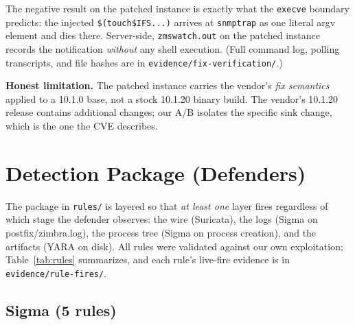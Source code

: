 The negative result on the patched instance is exactly what the
\texttt{execve} boundary predicts: the injected
\texttt{\$(touch\${IFS}...)} arrives at \texttt{snmptrap} as one literal
argv element and dies there. Server-side, \texttt{zmswatch.out} on the
patched instance records the notification \emph{without} any shell
execution. (Full command log, polling transcripts, and file hashes are in
\texttt{evidence/fix-verification/}.)

\textbf{Honest limitation.} The patched instance carries the vendor's
\emph{fix semantics} applied to a 10.1.0 base, not a stock 10.1.20 binary
build. The vendor's 10.1.20 release contains additional changes; our A/B
isolates the specific sink change, which is the one the CVE describes.

\section{Detection Package (Defenders)}
\label{sec:detection}

The package in \texttt{rules/} is layered so that \emph{at least one} layer
fires regardless of which stage the defender observes: the wire (Suricata),
the logs (Sigma on postfix/zimbra.log), the process tree (Sigma on
process creation), and the artifacts (YARA on disk). All rules were
validated against our own exploitation; Table~\ref{tab:rules} summarizes,
and each rule's live-fire evidence is in \texttt{evidence/rule-fires/}.

\subsection{Sigma (5 rules)}

